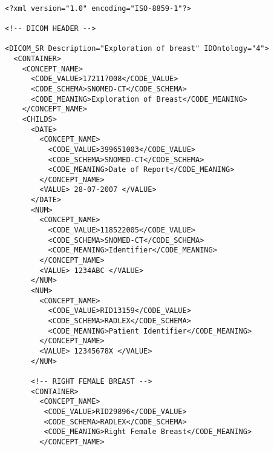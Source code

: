 \lstset{escapechar=@,style=dicom}
\renewcommand*\lstlistingname{Fichero}

\begin{lstlisting}[label=dicom-report,caption=Informe estructurado de una exploración de mama]

<?xml version="1.0" encoding="ISO-8859-1"?>

<!-- DICOM HEADER -->

<DICOM_SR Description="Exploration of breast" IDOntology="4">
  <CONTAINER>
    <CONCEPT_NAME>
      <CODE_VALUE>172117008</CODE_VALUE>
      <CODE_SCHEMA>SNOMED-CT</CODE_SCHEMA>
      <CODE_MEANING>Exploration of Breast</CODE_MEANING>
    </CONCEPT_NAME>
    <CHILDS>
      <DATE>
        <CONCEPT_NAME>
          <CODE_VALUE>399651003</CODE_VALUE>
          <CODE_SCHEMA>SNOMED-CT</CODE_SCHEMA>
          <CODE_MEANING>Date of Report</CODE_MEANING>
        </CONCEPT_NAME>
        <VALUE> 28-07-2007 </VALUE>
      </DATE>
      <NUM>
        <CONCEPT_NAME>
          <CODE_VALUE>118522005</CODE_VALUE>
          <CODE_SCHEMA>SNOMED-CT</CODE_SCHEMA>
          <CODE_MEANING>Identifier</CODE_MEANING>
        </CONCEPT_NAME>
        <VALUE> 1234ABC </VALUE>
      </NUM>
      <NUM>
        <CONCEPT_NAME>
          <CODE_VALUE>RID13159</CODE_VALUE>
          <CODE_SCHEMA>RADLEX</CODE_SCHEMA>
          <CODE_MEANING>Patient Identifier</CODE_MEANING>
        </CONCEPT_NAME>
        <VALUE> 12345678X </VALUE>
      </NUM>

      <!-- RIGHT FEMALE BREAST -->
      <CONTAINER>
        <CONCEPT_NAME>
         <CODE_VALUE>RID29896</CODE_VALUE>
         <CODE_SCHEMA>RADLEX</CODE_SCHEMA>
         <CODE_MEANING>Right Female Breast</CODE_MEANING>
        </CONCEPT_NAME>


\end{lstlisting}
